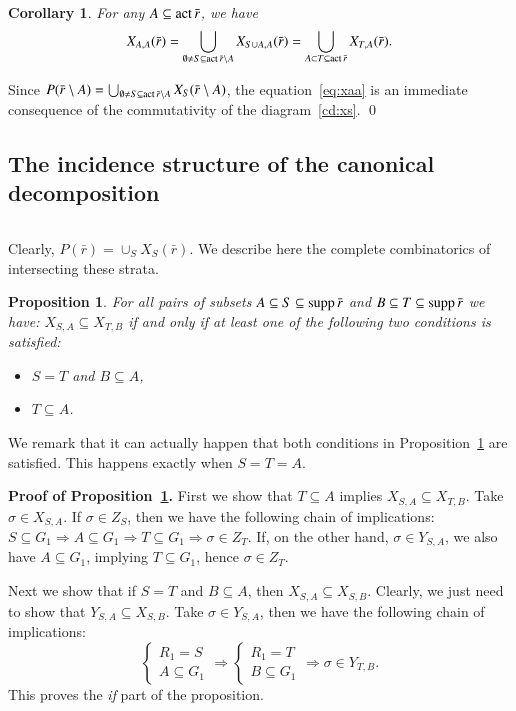 \documentclass{amsart}[10pt]
\newtheorem{prop}[theorem]{Proposition}
\newtheorem{crl}[theorem]{Corollary}
\newcommand{\pr}{\nin{\bf Proof.} }
\newcommand{\act}{\text{\rm act}\,}
\newcommand{\es}{\emptyset}
\newcommand{\sm}{\setminus}
\newcommand{\supp}{\text{\rm supp}\,}
\newcommand{\tr}{{\bar r}}
\numberwithin{equation}{section}
\numberwithin{figure}{section}
\numberwithin{table}{section}
\begin{document}
\begin{crl}\label{crl:xaa}
 For any $A\subseteq\act\tr$, we have
\begin{equation}\label{eq:xaa}
X_{A,A}(\tr)=\bigcup_{\es\neq S\subseteq\act\tr\sm A}X_{S\cup A,A}(\tr)=
\bigcup_{A\subset T\subseteq\act\tr}X_{T,A}(\tr).
\end{equation}
\end{crl}
\pr Since $P(\tr\sm A)=\bigcup_{\es\neq S\subseteq\act\tr\sm
  A}X_S(\tr\sm A)$, the equation~\eqref{eq:xaa} is an immediate
consequence of the commutativity of the diagram~\eqref{cd:xs}. \qed

\subsection{The incidence structure of the canonical decomposition} $\,$

\nin Clearly, $P(\tr)=\cup_S X_S(\tr)$. We describe here the complete
combinatorics of intersecting these strata.

\begin{prop} \label{pr:inc1}
For all pairs of subsets $A\subseteq S\subseteq\supp\tr$ and
$B\subseteq T\subseteq\supp\tr$ we have: $X_{S,A}\subseteq X_{T,B}$ if
and only if at least one of the following two conditions is satisfied:
\begin{itemize}
\item $S=T$ and $B\subseteq A$,
\item $T\subseteq A$.
\end{itemize} 
\end{prop}

\noindent
We remark that it can actually happen that both conditions in
Proposition~\ref{pr:inc1} are satisfied. This happens exactly when
$S=T=A$.

\vspace{5pt}

\noindent
{\bf Proof of Proposition~\ref{pr:inc1}.}  First we show that
$T\subseteq A$ implies $X_{S,A}\subseteq X_{T,B}$.  Take $\sigma\in
X_{S,A}$. If $\sigma\in Z_S$, then we have the following chain of
implications: $S\subseteq G_1\Rightarrow A\subseteq G_1\Rightarrow
T\subseteq G_1\Rightarrow\sigma\in Z_T$. If, on the other hand,
$\sigma\in Y_{S,A}$, we also have $A\subseteq G_1$, implying
$T\subseteq G_1$, hence $\sigma\in Z_T$.

Next we show that if $S=T$ and $B\subseteq A$, then $X_{S,A}\subseteq
X_{S,B}$.  Clearly, we just need to show that $Y_{S,A}\subseteq
X_{S,B}$.  Take $\sigma\in Y_{S,A}$, then we have the following chain
of implications:
\[\begin{cases}R_1=S\\A\subseteq G_1\end{cases}\Rightarrow
\begin{cases}R_1=T\\B\subseteq G_1\end{cases}
\Rightarrow\sigma\in Y_{T,B}.\]
This proves the {\it if} part of the proposition.
\end{document}
